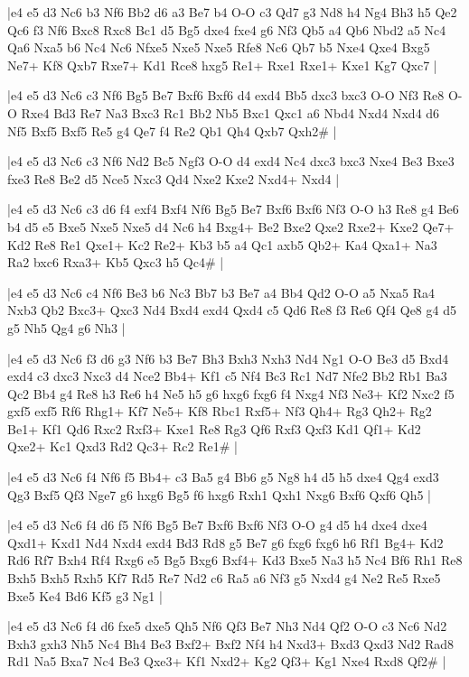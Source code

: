 \whitename{}
\blackname{}
\makegametitle
|e4 e5 d3 Nc6 b3 Nf6 Bb2 d6 a3 Be7 b4 O-O c3 Qd7 g3 Nd8 h4 Ng4 Bh3 h5 Qe2 Qc6 f3 Nf6 Bxc8 Rxc8 Bc1 d5 Bg5 dxe4 fxe4 g6 Nf3 Qb5 a4 Qb6 Nbd2 a5 Nc4 Qa6 Nxa5 b6 Nc4 Nc6 Nfxe5 Nxe5 Nxe5 Rfe8 Nc6 Qb7 b5 Nxe4 Qxe4 Bxg5 Ne7+ Kf8 Qxb7 Rxe7+ Kd1 Rce8 hxg5 Re1+ Rxe1 Rxe1+ Kxe1 Kg7 Qxc7  |

\whitename{}
\blackname{}
\makegametitle
|e4 e5 d3 Nc6 c3 Nf6 Bg5 Be7 Bxf6 Bxf6 d4 exd4 Bb5 dxc3 bxc3 O-O Nf3 Re8 O-O Rxe4 Bd3 Re7 Na3 Bxc3 Rc1 Bb2 Nb5 Bxc1 Qxc1 a6 Nbd4 Nxd4 Nxd4 d6 Nf5 Bxf5 Bxf5 Re5 g4 Qe7 f4 Re2 Qb1 Qh4 Qxb7 Qxh2\#  |

\whitename{}
\blackname{}
\makegametitle
|e4 e5 d3 Nc6 c3 Nf6 Nd2 Bc5 Ngf3 O-O d4 exd4 Nc4 dxc3 bxc3 Nxe4 Be3 Bxe3 fxe3 Re8 Be2 d5 Nce5 Nxc3 Qd4 Nxe2 Kxe2 Nxd4+ Nxd4  |

\whitename{}
\blackname{}
\makegametitle
|e4 e5 d3 Nc6 c3 d6 f4 exf4 Bxf4 Nf6 Bg5 Be7 Bxf6 Bxf6 Nf3 O-O h3 Re8 g4 Be6 b4 d5 e5 Bxe5 Nxe5 Nxe5 d4 Nc6 h4 Bxg4+ Be2 Bxe2 Qxe2 Rxe2+ Kxe2 Qe7+ Kd2 Re8 Re1 Qxe1+ Kc2 Re2+ Kb3 b5 a4 Qc1 axb5 Qb2+ Ka4 Qxa1+ Na3 Ra2 bxc6 Rxa3+ Kb5 Qxc3 h5 Qc4\#  |

\whitename{}
\blackname{}
\makegametitle
|e4 e5 d3 Nc6 c4 Nf6 Be3 b6 Nc3 Bb7 b3 Be7 a4 Bb4 Qd2 O-O a5 Nxa5 Ra4 Nxb3 Qb2 Bxc3+ Qxc3 Nd4 Bxd4 exd4 Qxd4 c5 Qd6 Re8 f3 Re6 Qf4 Qe8 g4 d5 g5 Nh5 Qg4 g6 Nh3  |

\whitename{}
\blackname{}
\makegametitle
|e4 e5 d3 Nc6 f3 d6 g3 Nf6 b3 Be7 Bh3 Bxh3 Nxh3 Nd4 Ng1 O-O Be3 d5 Bxd4 exd4 c3 dxc3 Nxc3 d4 Nce2 Bb4+ Kf1 c5 Nf4 Bc3 Rc1 Nd7 Nfe2 Bb2 Rb1 Ba3 Qc2 Bb4 g4 Re8 h3 Re6 h4 Ne5 h5 g6 hxg6 fxg6 f4 Nxg4 Nf3 Ne3+ Kf2 Nxc2 f5 gxf5 exf5 Rf6 Rhg1+ Kf7 Ne5+ Kf8 Rbc1 Rxf5+ Nf3 Qh4+ Rg3 Qh2+ Rg2 Be1+ Kf1 Qd6 Rxc2 Rxf3+ Kxe1 Re8 Rg3 Qf6 Rxf3 Qxf3 Kd1 Qf1+ Kd2 Qxe2+ Kc1 Qxd3 Rd2 Qc3+ Rc2 Re1\#  |

\whitename{}
\blackname{}
\makegametitle
|e4 e5 d3 Nc6 f4 Nf6 f5 Bb4+ c3 Ba5 g4 Bb6 g5 Ng8 h4 d5 h5 dxe4 Qg4 exd3 Qg3 Bxf5 Qf3 Nge7 g6 hxg6 Bg5 f6 hxg6 Rxh1 Qxh1 Nxg6 Bxf6 Qxf6 Qh5  |

\whitename{}
\blackname{}
\makegametitle
|e4 e5 d3 Nc6 f4 d6 f5 Nf6 Bg5 Be7 Bxf6 Bxf6 Nf3 O-O g4 d5 h4 dxe4 dxe4 Qxd1+ Kxd1 Nd4 Nxd4 exd4 Bd3 Rd8 g5 Be7 g6 fxg6 fxg6 h6 Rf1 Bg4+ Kd2 Rd6 Rf7 Bxh4 Rf4 Rxg6 e5 Bg5 Bxg6 Bxf4+ Kd3 Bxe5 Na3 h5 Nc4 Bf6 Rh1 Re8 Bxh5 Bxh5 Rxh5 Kf7 Rd5 Re7 Nd2 c6 Ra5 a6 Nf3 g5 Nxd4 g4 Ne2 Re5 Rxe5 Bxe5 Ke4 Bd6 Kf5 g3 Ng1  |

\whitename{}
\blackname{}
\makegametitle
|e4 e5 d3 Nc6 f4 d6 fxe5 dxe5 Qh5 Nf6 Qf3 Be7 Nh3 Nd4 Qf2 O-O c3 Nc6 Nd2 Bxh3 gxh3 Nh5 Nc4 Bh4 Be3 Bxf2+ Bxf2 Nf4 h4 Nxd3+ Bxd3 Qxd3 Nd2 Rad8 Rd1 Na5 Bxa7 Nc4 Be3 Qxe3+ Kf1 Nxd2+ Kg2 Qf3+ Kg1 Nxe4 Rxd8 Qf2\#  |

